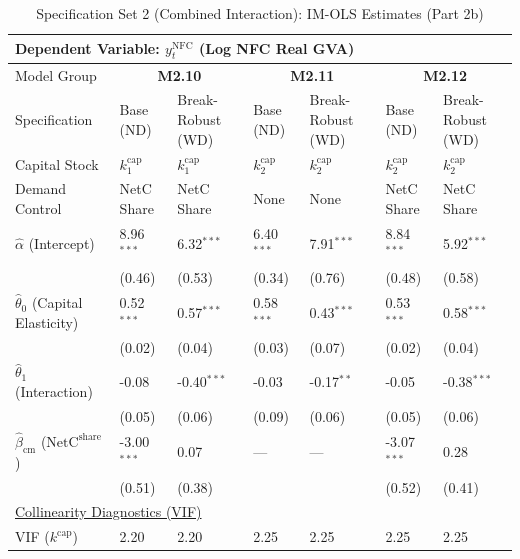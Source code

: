 \begin{table}[H]
\centering
\caption{Specification Set 2 (Combined Interaction): IM-OLS Estimates (Part 2b)}
\label{tab:spec_set_2_p2b}
\scriptsize
\begin{tabular}{p{3.8cm}p{2.1cm}p{2.1cm}p{2.1cm}p{2.1cm}p{2.1cm}p{2.1cm}}
\toprule
\multicolumn{7}{l}{\textbf{Dependent Variable: $y_t^{\text{NFC}}$ (Log NFC Real GVA)}} \\
\midrule
Model Group & \multicolumn{2}{c}{\textbf{M2.10}} & \multicolumn{2}{c}{\textbf{M2.11}} & \multicolumn{2}{c}{\textbf{M2.12}}  \\
Specification & Base (ND) & Break-Robust (WD) & Base (ND) & Break-Robust (WD) & Base (ND) & Break-Robust (WD)  \\
Capital Stock & $k^{\text{cap}}_1$ & $k^{\text{cap}}_1$ & $k^{\text{cap}}_2$ & $k^{\text{cap}}_2$ & $k^{\text{cap}}_2$ & $k^{\text{cap}}_2$  \\
Demand Control & NetC Share & NetC Share & None & None & NetC Share & NetC Share  \\
\midrule
$\hat{\alpha}$ (Intercept)  & 8.96$^{***}$ & 6.32$^{***}$ & 6.40$^{***}$ & 7.91$^{***}$ & 8.84$^{***}$ & 5.92$^{***}$  \\
 & {\scriptsize (0.46)} & {\scriptsize (0.53)} & {\scriptsize (0.34)} & {\scriptsize (0.76)} & {\scriptsize (0.48)} & {\scriptsize (0.58)}  \\
[1ex]
$\hat{\theta}_0$ (Capital Elasticity)  & 0.52$^{***}$ & 0.57$^{***}$ & 0.58$^{***}$ & 0.43$^{***}$ & 0.53$^{***}$ & 0.58$^{***}$  \\
 & {\scriptsize (0.02)} & {\scriptsize (0.04)} & {\scriptsize (0.03)} & {\scriptsize (0.07)} & {\scriptsize (0.02)} & {\scriptsize (0.04)}  \\
$\hat{\theta}_1$ (Interaction)  & -0.08 & -0.40$^{***}$ & -0.03 & -0.17$^{**}$ & -0.05 & -0.38$^{***}$  \\
 & {\scriptsize (0.05)} & {\scriptsize (0.06)} & {\scriptsize (0.09)} & {\scriptsize (0.06)} & {\scriptsize (0.05)} & {\scriptsize (0.06)}  \\
$\hat{\beta}_{\text{cm}}$ ($\text{NetC}^{\text{share}}$)  & -3.00$^{***}$ & 0.07 & --- & --- & -3.07$^{***}$ & 0.28  \\
 & {\scriptsize (0.51)} & {\scriptsize (0.38)} &  &  & {\scriptsize (0.52)} & {\scriptsize (0.41)}  \\
\midrule
\multicolumn{7}{l}{\underline{Collinearity Diagnostics (VIF)}} \\
VIF ($k^{\text{cap}}$) & 2.20 & 2.20 & 2.25 & 2.25 & 2.25 & 2.25  \\

\end{tabular}
\end{table}
